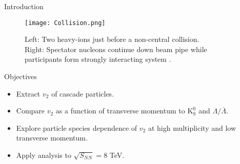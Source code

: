 \documentclass[final]{beamer}
\newlength{\sepwid}
\newlength{\onecolwid}
\newlength{\twocolwid}
\begin{document}
\begin{frame}[t]
\begin{columns}[t]
\begin{column}{\onecolwid}
\begin{block}{Introduction}
\end{block}


\begin{figure}
\texttt{[image: Collision.png]}
\caption{Left: Two heavy-ions just before a non-central collision. Right:
Spectator nucleons continue down beam pipe while participants form strongly
interacting system \cite{Snellings}.}
\end{figure}



\begin{alertblock}{Objectives}

\begin{itemize}
\item Extract $ v_{2} $ of cascade particles.
\item Compare $ v_{2} $ as a function of transverse momentum to $
\mathrm{K}_{\mathrm{S}}^{0} $ and $ \Lambda/\overline{\Lambda} $.
\item Explore particle species dependence of $ v_{2} $ at high multiplicity and
low transverse momentum.
\item Apply analysis to $ \sqrt{S_{NN}} = 8 $ TeV.
\end{itemize}

\end{alertblock}
\end{column} %

\begin{column}{\sepwid}\end{column} %

\begin{column}{\twocolwid} %

\begin{columns}[t,totalwidth=\twocolwid] %

\begin{column}{\onecolwid}\vspace{-.6in} %



\end{column}
\end{columns}
\end{column}
\end{columns}
\end{frame}
\end{document}
